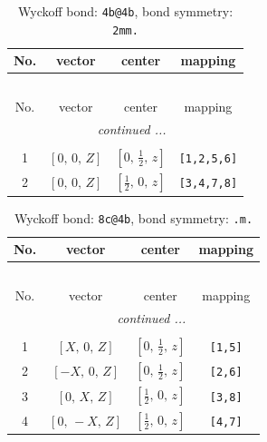 \documentclass[fleqn,8pt]{jsarticle}
\begin{document}
\renewcommand{\arraystretch}{1.2}
\begin{longtable}{cccc}
\caption{Wyckoff bond: {\tt 4b@4b}, bond symmetry: {\tt 2mm.}}
 \\
 \hline \hline
No. & vector & center & mapping \\ \hline \endfirsthead

\multicolumn{3}{l}{\tablename\ \thetable{}} \\
 \hline \hline
No. & vector & center & mapping \\ \hline \endhead

 \hline \hline
\multicolumn{3}{r}{\footnotesize\it continued ...} \\ \endfoot

 \hline \hline
\multicolumn{3}{r}{} \\ \endlastfoot

1 & $\left[ 0,\, 0,\, Z \right]$ & $\left[ 0,\, \frac{1}{2},\, z \right]$ & {\tt [1,2,5,6]} \\ \hline
2 & $\left[ 0,\, 0,\, Z \right]$ & $\left[ \frac{1}{2},\, 0,\, z \right]$ & {\tt [3,4,7,8]} \\
\end{longtable}
\renewcommand{\arraystretch}{1.2}
\begin{longtable}{cccc}
\caption{Wyckoff bond: {\tt 8c@4b}, bond symmetry: {\tt .m.}}
 \\
 \hline \hline
No. & vector & center & mapping \\ \hline \endfirsthead

\multicolumn{3}{l}{\tablename\ \thetable{}} \\
 \hline \hline
No. & vector & center & mapping \\ \hline \endhead

 \hline \hline
\multicolumn{3}{r}{\footnotesize\it continued ...} \\ \endfoot

 \hline \hline
\multicolumn{3}{r}{} \\ \endlastfoot

1 & $\left[ X,\, 0,\, Z \right]$ & $\left[ 0,\, \frac{1}{2},\, z \right]$ & {\tt [1,5]} \\ \hline
2 & $\left[ - X,\, 0,\, Z \right]$ & $\left[ 0,\, \frac{1}{2},\, z \right]$ & {\tt [2,6]} \\ \hline
3 & $\left[ 0,\, X,\, Z \right]$ & $\left[ \frac{1}{2},\, 0,\, z \right]$ & {\tt [3,8]} \\ \hline
4 & $\left[ 0,\, - X,\, Z \right]$ & $\left[ \frac{1}{2},\, 0,\, z \right]$ & {\tt [4,7]} \\
\end{longtable}
\end{document}
